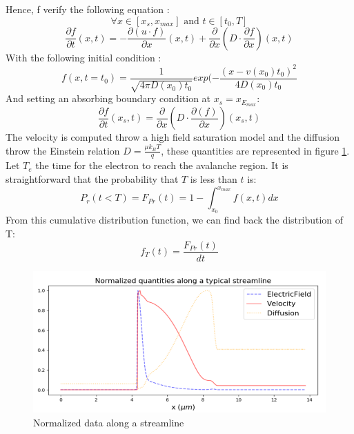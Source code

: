 \documentclass[10pt,a4paper,twocolumn]{article}
\begin{document}
 Hence, f verify the following equation : 
 \[ \forall x \in \left[ x_s, x_{max} \right]  \text{ and } t \in \left[ t_0, T \right] \]
\begin{equation}\label{eq:GeneralAD}
\frac{\partial f}{\partial t}(x,t) = 
	- \frac{\partial( u \cdot f )}{\partial x}(x,t)
	+ \frac{\partial}{\partial x}\left(D \cdot \frac{\partial f }{\partial x}\right)(x,t)
\end{equation}
With the following initial condition : 
\begin{equation}
f(x, t=t_0) = \frac{1}{\sqrt{4 \pi D(x_0) t_0}} exp(-\frac{(x-v(x_0)t_0)^2}{4D(x_0)t_0}
\end{equation}
And setting an absorbing boundary condition at $x_s=x_{E_{max}}$:
\begin{equation}
\frac{\partial f}{\partial t}(x_s,t) = 
	\frac{\partial}{\partial x}\left(D \cdot \frac{\partial( f )}{\partial x}\right)(x_s,t)
\end{equation}
The velocity is computed throw a high field saturation model and the diffusion throw the Einstein relation $D = \frac{\mu k_B T}{q}$, these quantities are represented in figure \ref{fig:VelocityDiffusion}. 
Let $T_e$ the time for the electron to reach the avalanche region. It is straightforward that the probability that $T$ is less than $t$ is:
 \[P_r(t<T) =  F_{Pr}(t) = 1 - \int_{x_0}^{x_{max}} f(x, t) dx \]
From this cumulative distribution function, we can find back the distribution of T:
\begin{equation}
f_T (t) = \frac{F_{Pr}(t)}{dt}
\end{equation}
\begin{figure}[hbtp]
\label{fig:VelocityDiffusion}
\includegraphics[scale=0.5]{../pictures/PythonVelocityDiffusionElectricField.png}
\caption{Normalized data along a  streamline}
\end{figure}
\end{document}
